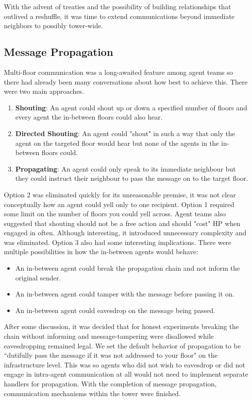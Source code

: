 With the advent of treaties and the possibility of building relationships that outlived a reshuffle, it was time to extend communications beyond immediate neighbors to possibly tower-wide.

\subsection{Message Propagation}
Multi-floor communication was a long-awaited feature among agent teams so there had already been many conversations about how best to achieve this. There were two main approaches.
\begin{enumerate}
    \item \textbf{Shouting}: An agent could shout up or down a specified number of floors and every agent the in-between floors could also hear.
    \item \textbf{Directed Shouting}: An agent could "shout" in such a way that only the agent on the targeted floor would hear but none of the agents in the in-between floors could.
    \item \textbf{Propagating}: An agent could only speak to its immediate neighbour but they could instruct their neighbour to pass the message on to the target floor.
\end{enumerate}
Option 2 was eliminated quickly for its unreasonable premise, it was not clear conceptually how an agent could yell only to one recipient. \newline
Option 1 required some limit on the number of floors you could yell across. Agent teams also suggested that shouting should not be a free action and should "cost" HP when engaged in often. Although interesting, it introduced unnecessary complexity and was eliminated. \newline
Option 3 also had some interesting implications. There were multiple possibilities in how the in-between agents would behave:
\begin{itemize}
    \item An in-between agent could break the propagation chain and not inform the original sender.
    \item An in-between agent could tamper with the message before passing it on.
    \item An in-between agent could eavesdrop on the message being passed.
\end{itemize}
After some discussion, it was decided that for honest experiments breaking the chain without informing and message-tampering were disallowed while eavesdropping remained legal. \newline
We set the default behavior of propagation to be ``dutifully pass the message if it was not addressed to your floor" on the infrastructure level. This was so agents who did not wish to eavesdrop or did not engage in intra-agent communication at all would not need to implement separate handlers for propagation. \newline
With the completion of message propagation, communication mechanisms within the tower were finished.

